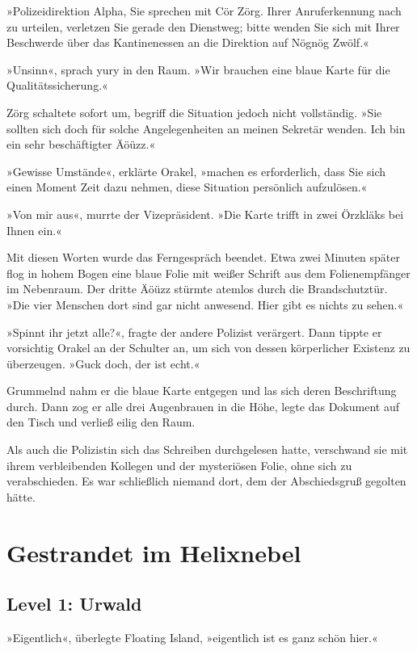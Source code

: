 »Polizeidirektion Alpha, Sie sprechen mit Cör Zörg. Ihrer Anruferkennung nach zu urteilen, verletzen Sie gerade den Dienstweg; bitte wenden Sie sich mit Ihrer Beschwerde über das Kantinenessen an die Direktion auf Nögnög Zwölf.«

»Unsinn«, sprach yury in den Raum. »Wir brauchen eine blaue Karte für die Qualitätssicherung.«

Zörg schaltete sofort um, begriff die Situation jedoch nicht vollständig. »Sie sollten sich doch für solche Angelegenheiten an meinen Sekretär wenden. Ich bin ein sehr beschäftigter Äöüzz.«

»Gewisse Umstände«, erklärte Orakel, »machen es erforderlich, dass Sie sich einen Moment Zeit dazu nehmen, diese Situation persönlich aufzulösen.«

»Von mir aus«, murrte der Vizepräsident. »Die Karte trifft in zwei Örzkläks bei Ihnen ein.«

Mit diesen Worten wurde das Ferngespräch beendet. Etwa zwei Minuten später flog in hohem Bogen eine blaue Folie mit weißer Schrift aus dem Folienempfänger im Nebenraum. Der dritte Äöüzz stürmte atemlos durch die Brandschutztür. »Die vier Menschen dort sind gar nicht anwesend. Hier gibt es nichts zu sehen.«

»Spinnt ihr jetzt alle?«, fragte der andere Polizist verärgert. Dann tippte er vorsichtig Orakel an der Schulter an, um sich von dessen körperlicher Existenz zu überzeugen. »Guck doch, der ist echt.«

Grummelnd nahm er die blaue Karte entgegen und las sich deren Beschriftung durch. Dann zog er alle drei Augenbrauen in die Höhe, legte das Dokument auf den Tisch und verließ eilig den Raum.

Als auch die Polizistin sich das Schreiben durchgelesen hatte, verschwand sie mit ihrem verbleibenden Kollegen und der mysteriösen Folie, ohne sich zu verabschieden. Es war schließlich niemand dort, dem der Abschiedsgruß gegolten hätte.


\chapter{Gestrandet im Helixnebel}

\section{Level 1: Urwald}

»Eigentlich«, überlegte Floating Island, »eigentlich ist es ganz schön hier.«

